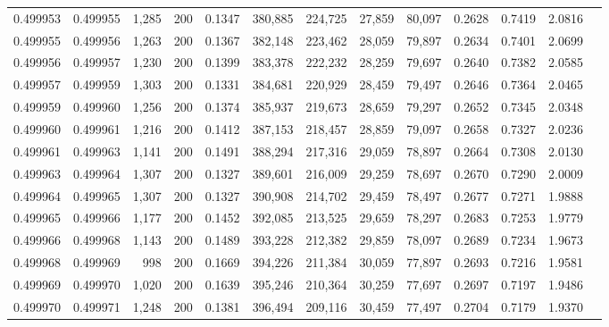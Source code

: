 \begin{tabular}{rrrrrrrrrrrrr}
0.499953 & 0.499955 &  1,285 & 200 &                                     0.1347 & 380,885 & 224,725 &  27,859 &  80,097 & 0.2628 & 0.7419 & 2.0816 \\
0.499955 & 0.499956 &  1,263 & 200 &                                     0.1367 & 382,148 & 223,462 &  28,059 &  79,897 & 0.2634 & 0.7401 & 2.0699 \\
0.499956 & 0.499957 &  1,230 & 200 &                                     0.1399 & 383,378 & 222,232 &  28,259 &  79,697 & 0.2640 & 0.7382 & 2.0585 \\
0.499957 & 0.499959 &  1,303 & 200 &                                     0.1331 & 384,681 & 220,929 &  28,459 &  79,497 & 0.2646 & 0.7364 & 2.0465 \\
0.499959 & 0.499960 &  1,256 & 200 &                                     0.1374 & 385,937 & 219,673 &  28,659 &  79,297 & 0.2652 & 0.7345 & 2.0348 \\
0.499960 & 0.499961 &  1,216 & 200 &                                     0.1412 & 387,153 & 218,457 &  28,859 &  79,097 & 0.2658 & 0.7327 & 2.0236 \\
0.499961 & 0.499963 &  1,141 & 200 &                                     0.1491 & 388,294 & 217,316 &  29,059 &  78,897 & 0.2664 & 0.7308 & 2.0130 \\
0.499963 & 0.499964 &  1,307 & 200 &                                     0.1327 & 389,601 & 216,009 &  29,259 &  78,697 & 0.2670 & 0.7290 & 2.0009 \\
0.499964 & 0.499965 &  1,307 & 200 &                                     0.1327 & 390,908 & 214,702 &  29,459 &  78,497 & 0.2677 & 0.7271 & 1.9888 \\
0.499965 & 0.499966 &  1,177 & 200 &                                     0.1452 & 392,085 & 213,525 &  29,659 &  78,297 & 0.2683 & 0.7253 & 1.9779 \\
0.499966 & 0.499968 &  1,143 & 200 &                                     0.1489 & 393,228 & 212,382 &  29,859 &  78,097 & 0.2689 & 0.7234 & 1.9673 \\
0.499968 & 0.499969 &    998 & 200 &                                     0.1669 & 394,226 & 211,384 &  30,059 &  77,897 & 0.2693 & 0.7216 & 1.9581 \\
0.499969 & 0.499970 &  1,020 & 200 &                                     0.1639 & 395,246 & 210,364 &  30,259 &  77,697 & 0.2697 & 0.7197 & 1.9486 \\
0.499970 & 0.499971 &  1,248 & 200 &                                     0.1381 & 396,494 & 209,116 &  30,459 &  77,497 & 0.2704 & 0.7179 & 1.9370 \\

\end{tabular}
